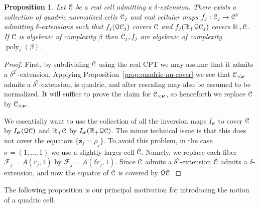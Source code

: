 \documentclass[reqno]{amsart}
\newtheorem{Prop}[Cor]{Proposition}{\bfseries}{\itshape}
\renewcommand\~[1]{\widetilde{#1}}
\def\poly{\operatorname{poly}} \def\J{\operatorname{J}}
\def\cF{{\mathcal F}} \def\cL{{\mathcal L}} \def\cR{{\mathcal R}}
\def\vz{{\mathbf z}}
\def\vsigma{{\boldsymbol\sigma}}
\def\vsigma{{\boldsymbol\sigma}}
\def\vnu{{\boldsymbol\nu}}
\def\Qua{\mathcal{Q}}
\begin{document}
\begin{Prop}\label{prop:quadric-cover}
  Let ${\mathcal C}$ be a real cell admitting a $\delta$-extension. There
  exists a collection of quadric normalized cells ${\mathcal C}_j$ and real
  cellular maps $f_j:{\mathcal C}_j\to{\mathcal C}^\delta$ admitting $\delta$-extensions
  such that $f_j(\Qua\cC_j)$ covers ${\mathcal C}$ and $f_j(\R_+\Qua\cC_j)$
  covers ${\mathbb R}_+{\mathcal C}$. If ${\mathcal C}$ is algebraic of complexity $\beta$ then
  ${\mathcal C}_j,f_j$ are algebraic of complexity $\poly_\ell(\beta)$.
\end{Prop}
\begin{proof}
  First, by subdividing ${\mathcal C}$ using the real CPT we may assume that it
  admits a $\delta^{2^\ell}$-extension. Applying
  Proposition~\ref{prop:quadric-nu-cover} we see that $\cC_{\times\vnu}$
  admits a $\delta^2$-extension, is quadric, and after rescaling may
  also be assumed to be normalized. It will suffice to prove the claim
  for $\cC_{\times\vnu}$, so henceforth we replace ${\mathcal C}$ by
  $\cC_{\times\vnu}$.

  We essentially want to use the collection of all the inversion maps
  $I_\vsigma$ to cover ${\mathcal C}$ by $I_\vsigma(\Qua\cC)$ and ${\mathbb R}_+{\mathcal C}$ by
  $I_\vsigma(\R_+\Qua\cC)$. The minor technical issue is that this
  does not cover the equators $\{\vz_j=\rho_j\}$. To avoid this
  problem, in the case $\sigma=(1,\ldots,1)$ we use a slightly larger
  cell $\tilde{{\mathcal C}}$. Namely, we replace each fiber $\cF_j=A(r_j,1)$ by
  $\tilde\cF_j=A(\delta r_j,1)$. Since ${\mathcal C}$ admits a
  $\delta^2$-extension $\tilde{{\mathcal C}}$ admits a $\delta$-extension, and
  now the equator of ${\mathcal C}$ is covered by $\Qua\tilde\cC$.
\end{proof}

The following proposition is our principal motivation for introducing
the notion of a quadric cell.
\end{document}
